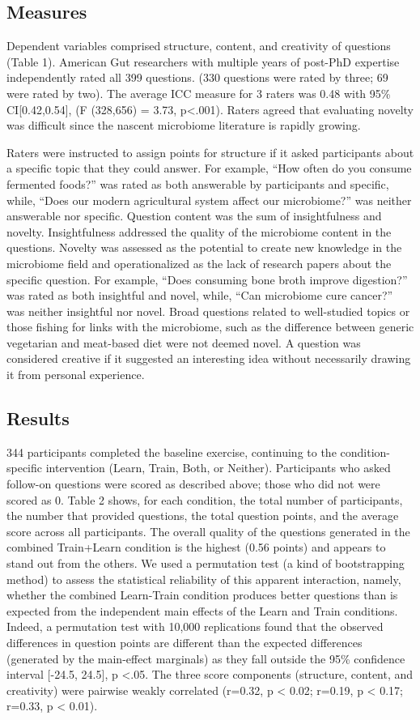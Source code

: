 \subsection{Measures}
Dependent variables comprised structure, content, and creativity of questions (Table 1). American Gut researchers with multiple years of post-PhD expertise independently rated all 399 questions. (330 questions were rated by three; 69 were rated by two). The average ICC measure for 3 raters was 0.48 with 95\% CI[0.42,0.54], (F (328,656) = 3.73, p<.001). Raters agreed that evaluating novelty was difficult since the nascent microbiome literature is rapidly growing.

Raters were instructed to assign points for structure if it asked participants about a specific topic that they could answer. For example, “How often do you consume fermented foods?” was rated as both answerable by participants and specific, while, “Does our modern agricultural system affect our microbiome?” was neither answerable nor specific. Question content was the sum of insightfulness and novelty. Insightfulness addressed the quality of the microbiome content in the questions. Novelty was assessed as the potential to create new knowledge in the microbiome field and operationalized as the lack of research papers about the specific question. For example, “Does consuming bone broth improve digestion?” was rated as both insightful and novel, while, “Can microbiome cure cancer?” was neither insightful nor novel. Broad questions related to well-studied topics or those fishing for links with the microbiome, such as the difference between generic vegetarian and meat-based diet were not deemed novel. A question was considered creative if it suggested an interesting idea without necessarily drawing it from personal experience. 

\subsection{Results}
344 participants completed the baseline exercise, continuing to the condition-specific intervention (Learn, Train, Both, or Neither). Participants who asked follow-on questions were scored as described above; those who did not were scored as 0. Table 2 shows, for each condition, the total number of participants, the number that provided questions, the total question points, and the average score across all participants. The overall quality of the questions generated in the combined Train+Learn condition is the highest (0.56 points) and appears to stand out from the others. We used a permutation test (a kind of bootstrapping method) to assess the statistical reliability of this apparent interaction, namely, whether the combined Learn-Train condition produces better questions than is expected from the independent main effects of the Learn and Train conditions. Indeed, a permutation test with 10,000 replications found that the observed differences in question points are different than the expected differences (generated by the main-effect marginals) as they fall outside the 95\% confidence interval [-24.5, 24.5], p <.05. The three score components (structure, content, and creativity) were pairwise weakly correlated (r=0.32, p < 0.02; r=0.19, p < 0.17; r=0.33, p < 0.01). 


